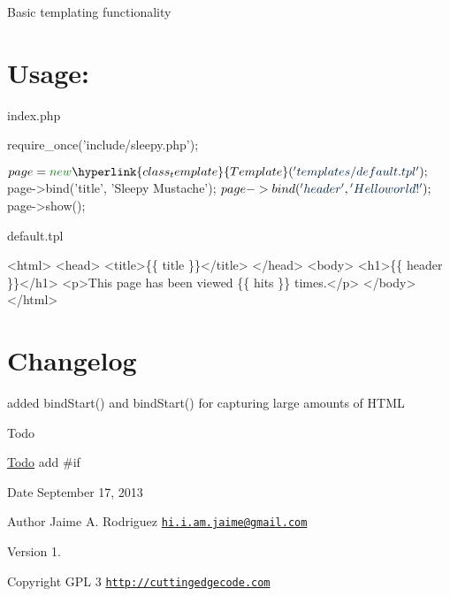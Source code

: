 Basic templating functionality\hypertarget{nav1_usage}{}\section{Usage\-:}\label{nav1_usage}
index.\-php 
\begin{DoxyCode}
require\_once(\textcolor{stringliteral}{'include/sleepy.php'});

$page = \textcolor{keyword}{new} \hyperlink{class_template}{Template}(\textcolor{stringliteral}{'templates/default.tpl'});
$page->bind(\textcolor{stringliteral}{'title'}, \textcolor{stringliteral}{'Sleepy Mustache'});
$page->bind(\textcolor{stringliteral}{'header'}, \textcolor{stringliteral}{'Hello world!'});
$page->show();
\end{DoxyCode}


default.\-tpl 
\begin{DoxyCode}
   <html>
   <head>
       <title>\{\{ title \}\}</title>
   </head>
   <body>
       <h1>\{\{ header \}\}</h1>
       <p>This page has been viewed \{\{ hits \}\} times.</p>
   </body>
</html>
\end{DoxyCode}
\hypertarget{mailer1_changelog}{}\section{Changelog}\label{mailer1_changelog}

\begin{DoxyItemize}
\item added bind\-Start() and bind\-Start() for capturing large amounts of H\-T\-M\-L
\end{DoxyItemize}

\begin{DoxyRefDesc}{Todo}
\item[\hyperlink{todo__todo000001}{Todo}]add \#if\end{DoxyRefDesc}


\begin{DoxyDate}{Date}
September 17, 2013 
\end{DoxyDate}
\begin{DoxyAuthor}{Author}
Jaime A. Rodriguez \href{mailto:hi.i.am.jaime@gmail.com}{\tt hi.\-i.\-am.\-jaime@gmail.\-com} 
\end{DoxyAuthor}
\begin{DoxyVersion}{Version}
1. 
\end{DoxyVersion}
\begin{DoxyCopyright}{Copyright}
G\-P\-L 3 \href{http://cuttingedgecode.com}{\tt http\-://cuttingedgecode.\-com} 
\end{DoxyCopyright}
